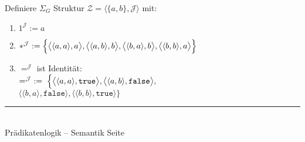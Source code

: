 \documentclass{slides}
\newcommand{\myrule}{\rule{20cm}{1mm}\\ }
\def\pair(#1,#2){\langle #1, #2 \rangle}
\newcounter{mypage}
\begin{document}
\begin{slide}{}
Definiere $\Sigma_G$ Struktur $\mathcal{Z} = \langle \{a, b\}, \mathcal{J}\rangle$ mit:
\begin{enumerate}
\item $1^\mathcal{J} := a$ 
\item $*^\mathcal{J} := \Bigl\{ \bigl\langle\pair(a,a), a\bigr\rangle,
                                   \bigl\langle\pair(a,b), b\bigr\rangle,
                                   \bigl\langle\pair(b,a), b\bigr\rangle,
                                   \bigl\langle\pair(b,b), a\bigr\rangle \Bigr\}$
\item $=^\mathcal{J}$ ist Identit\"{a}t: \\[0.1cm]
       $=^\mathcal{J} \;:=\; \Bigl\{ \bigl\langle\pair(a,a), \mathtt{true}\bigr\rangle,
                                 \bigl\langle\pair(a,b), \mathtt{false}\bigr\rangle,$\\[0.1cm]
\hspace*{2.3cm} $                \bigl\langle\pair(b,a), \mathtt{false}\bigr\rangle,
                                 \bigl\langle\pair(b,b), \mathtt{true}\bigr\rangle \Bigr\}$
\end{enumerate}



\vspace*{\fill}
\tiny \addtocounter{mypage}{1} 
\myrule
Pr\"{a}dikatenlogik -- Semantik \hspace*{\fill} Seite 
\end{slide}

\end{document}

